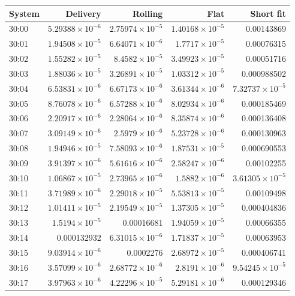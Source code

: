 \begin{table}[ht]
\centering\scriptsize
\begin{tabular}{lrrrr}
\toprule
System & Delivery & Rolling & Flat & Short fit\\
\midrule
30:00 & $5.29388\times10^{-6}$ & $2.75974\times10^{-5}$ & $1.40168\times10^{-5}$ & 0.00143869\\
30:01 & $1.94508\times10^{-5}$ & $6.64071\times10^{-6}$ & $1.7717\times10^{-5}$ & 0.00076315\\
30:02 & $1.55282\times10^{-5}$ & $8.4582\times10^{-5}$ & $3.49923\times10^{-5}$ & 0.00051716\\
30:03 & $1.88036\times10^{-5}$ & $3.26891\times10^{-5}$ & $1.03312\times10^{-5}$ & 0.000988502\\
30:04 & $6.53831\times10^{-6}$ & $6.67173\times10^{-6}$ & $3.61344\times10^{-6}$ & $7.32737\times10^{-5}$\\
30:05 & $8.76078\times10^{-6}$ & $6.57288\times10^{-6}$ & $8.02934\times10^{-6}$ & 0.000185469\\
30:06 & $2.20917\times10^{-6}$ & $2.28064\times10^{-6}$ & $8.35874\times10^{-6}$ & 0.000136408\\
30:07 & $3.09149\times10^{-6}$ & $2.5979\times10^{-6}$ & $5.23728\times10^{-6}$ & 0.000130963\\
30:08 & $1.94946\times10^{-5}$ & $7.58093\times10^{-6}$ & $1.87531\times10^{-5}$ & 0.000690553\\
30:09 & $3.91397\times10^{-6}$ & $5.61616\times10^{-6}$ & $2.58247\times10^{-6}$ & 0.00102255\\
30:10 & $1.06867\times10^{-5}$ & $2.73965\times10^{-6}$ & $1.5882\times10^{-6}$ & $3.61305\times10^{-5}$\\
30:11 & $3.71989\times10^{-6}$ & $2.29018\times10^{-5}$ & $5.53813\times10^{-5}$ & 0.00109498\\
30:12 & $1.01411\times10^{-5}$ & $2.19549\times10^{-5}$ & $1.37305\times10^{-5}$ & 0.000404836\\
30:13 & $1.5194\times10^{-5}$ & 0.00016681 & $1.94059\times10^{-5}$ & 0.00066355\\
30:14 & 0.000132932 & $6.31015\times10^{-6}$ & $1.71837\times10^{-5}$ & 0.00063953\\
30:15 & $9.03914\times10^{-6}$ & 0.0002276 & $2.68972\times10^{-5}$ & 0.000406741\\
30:16 & $3.57099\times10^{-6}$ & $2.68772\times10^{-6}$ & $2.8191\times10^{-6}$ & $9.54245\times10^{-5}$\\
30:17 & $3.97963\times10^{-6}$ & $4.22296\times10^{-5}$ & $5.29181\times10^{-6}$ & 0.000129346\\

\end{tabular}
\end{table}
